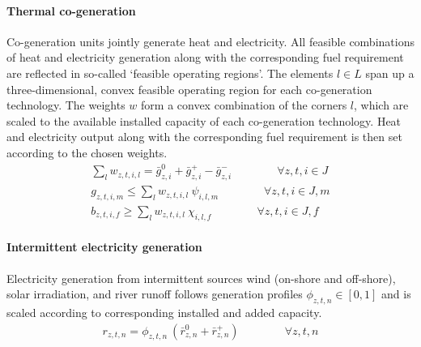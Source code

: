 \documentclass[11pt,a4paper]{article}
\begin{document}
\paragraph{Thermal co-generation}
Co-generation units jointly generate heat and electricity. All feasible combinations of heat and electricity generation along with the corresponding fuel requirement are reflected in so-called `feasible operating regions'. 
The elements $l \in L$ span up a three-dimensional, convex feasible operating region for each co-generation technology. 
The weights $w$ form a convex combination of the corners $l$, which are scaled to the available installed capacity of each co-generation technology.
Heat and electricity output along with the corresponding fuel requirement is then set according to the chosen weights.
\begin{align}
\sum_{l} w_{z,t,i,l} = \bar{g}^{0}_{z,i} + \bar{g}^{+}_{z,i} - \bar{g}^{-}_{z,i} \qquad \qquad \forall z,t,i \in J \\
g_{z,t,i,m} \leq \sum_{l} w_{z,t,i,l} \: \psi_{i,l,m} \qquad \qquad \forall z,t,i \in J, m \\
b_{z,t,i,f} \geq \sum_{l} w_{z,t,i,l} \: \chi_{i,l,f} \qquad \qquad \forall z,t,i \in J, f
\end{align}

\paragraph{Intermittent electricity generation}
Electricity generation from intermittent sources wind (on-shore and off-shore), solar irradiation, and river runoff follows generation profiles $\phi_{z,t,n} \in [0,1]$ and is scaled according to corresponding installed and added capacity.
\begin{align}
r_{z,t,n} = \phi_{z,t,n} \: \left( \bar{r}^{0}_{z,n} + \bar{r}^{+}_{z,n} \right) \qquad \qquad \forall z,t,n
\end{align}
\end{document}
